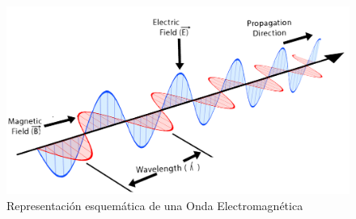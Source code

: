 \begin{figure}[h]
    \centering
        \includegraphics[width=15cm]{archivos/oem}
        \caption{Representación esquemática de una Onda Electromagnética}
        \label{fig:oem}
\end{figure}

